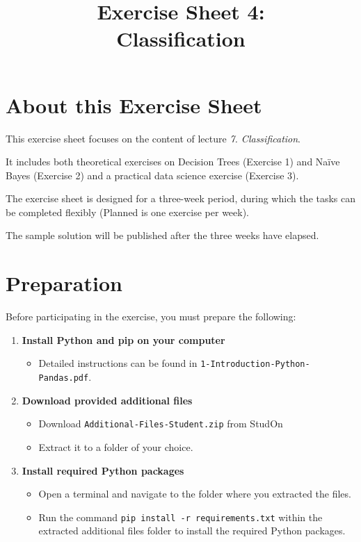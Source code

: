 \documentclass[
english,
smallborders
]{i6prcsht}
\begin{document}
\title{Exercise Sheet 4: \\ Classification}
\maketitle
\vspace*{-2cm}

\section*{About this Exercise Sheet}

This exercise sheet focuses on the content of lecture \textit{7. Classification}.

It includes both theoretical exercises on Decision Trees (Exercise 1) and Naïve Bayes (Exercise 2) and a practical data science exercise (Exercise 3).

The exercise sheet is designed for a three-week period, during which the tasks can be completed flexibly (Planned is one exercise per week).

The sample solution will be published after the three weeks have elapsed.

\section*{Preparation}

Before participating in the exercise, you must prepare the following:

\begin{enumerate}
	\item \textbf{Install Python and pip on your computer}

	      \begin{itemize}
		      \item Detailed instructions can be found in \texttt{1-Introduction-Python-Pandas.pdf}.
	      \end{itemize}

	\item \textbf{Download provided additional files}

	      \begin{itemize}
		      \item Download \texttt{Additional-Files-Student.zip} from StudOn
		      \item Extract it to a folder of your choice.
	      \end{itemize}

	\item \textbf{Install required Python packages}

	      \begin{itemize}
		      \item Open a terminal and navigate to the folder where you extracted the files.
		      \item Run the command \texttt{pip install -r requirements.txt} within the extracted additional files folder to install the required Python packages.
	      \end{itemize}


\end{enumerate}
\end{document}
